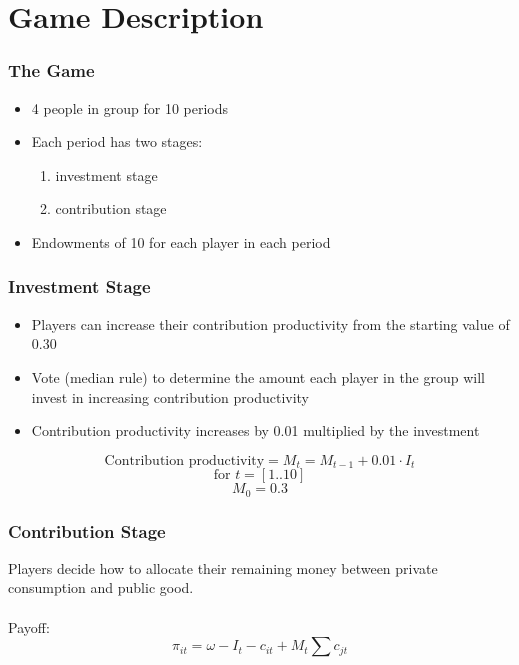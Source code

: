 \section{Game Description}

	\begin{frame}
		\frametitle{The Game} 
		
		\begin{itemize}
			\item
				4 people in group for 10 periods
			\item
				Each period has two stages:
				\begin{enumerate}
					\item 
						investment stage
					\item
						contribution stage
				\end{enumerate}
			\item
				Endowments of 10 for each player in each period
		\end{itemize}
		
	\end{frame}

	\begin{frame}
		\frametitle{Investment Stage} 
		
		\begin{itemize}
			\item
				Players can increase their contribution productivity from the starting value of 0.30
			\item
				Vote (median rule) to determine the amount each player in the group will invest in increasing contribution productivity
			\item
				Contribution productivity increases by 0.01 multiplied by the investment
		\end{itemize}
	
		\[
			\text{Contribution productivity} = M_t = M_{t-1} + 0.01 \cdot I_t
		\]
		\[
			\text{for } t = [1..10]
		\]
		\[
			M_0 = 0.3
		\]
		
		
	\end{frame}

	\begin{frame}
		\frametitle{Contribution Stage} 
		
		Players decide how to allocate their remaining money between private consumption and public good. \\~\\
		
		Payoff:
		\[
			\pi_{it} = \omega - I_t - c_{it} + M_t \sum c_{jt}
		\]
		
		
	\end{frame}

